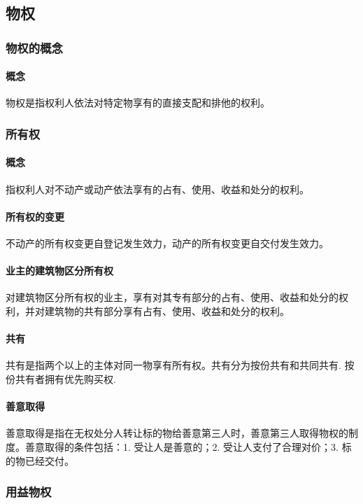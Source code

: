 \subsection{物权}

\subsubsection{物权的概念}

\paragraph{概念} 物权是指权利人依法对特定物享有的直接支配和排他的权利。

\subsubsection{所有权}

\paragraph{概念} 指权利人对不动产或动产依法享有的占有、使用、收益和处分的权利。 

\paragraph{所有权的变更} 不动产的所有权变更自登记发生效力，动产的所有权变更自交付发生效力。

\paragraph{业主的建筑物区分所有权} 对建筑物区分所有权的业主，享有对其专有部分的占有、使用、收益和处分的权利，并对建筑物的共有部分享有占有、使用、收益和处分的权利。 

\paragraph{共有} 共有是指两个以上的主体对同一物享有所有权。共有分为按份共有和共同共有. 按份共有者拥有优先购买权.

\paragraph{善意取得} 善意取得是指在无权处分人转让标的物给善意第三人时，善意第三人取得物权的制度。善意取得的条件包括：1. 受让人是善意的；2. 受让人支付了合理对价；3. 标的物已经交付。

\subsubsection{用益物权}

